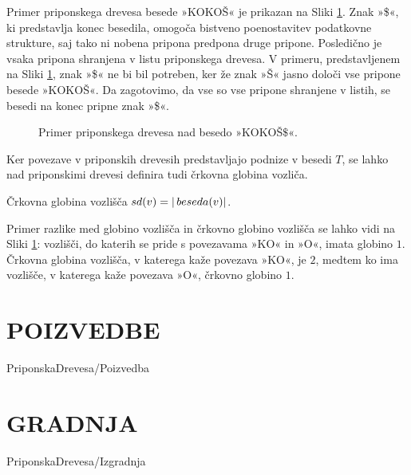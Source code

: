 
Primer priponskega drevesa besede »KOKOŠ« je prikazan na Sliki \ref{fig:PriponskoDrevo}. Znak »\$«, ki predstavlja konec besedila, omogoča bistveno poenostavitev podatkovne strukture, saj tako ni nobena pripona predpona druge pripone. Posledično je vsaka pripona shranjena v listu priponskega drevesa. V primeru, predstavljenem na Sliki \ref{fig:PriponskoDrevo}, znak »\$« ne bi bil potreben, ker že znak »Š« jasno določi vse pripone besede »KOKOŠ«. Da zagotovimo, da vse so vse pripone shranjene v listih, se besedi na konec pripne znak »\$«.

\begin{figure}[htb]
    \begin{center}
        
        \caption{Primer priponskega drevesa nad besedo »KOKOŠ$\$$«.} 
        \label{fig:PriponskoDrevo}
    \end{center}
\end{figure}


%
%
Ker povezave v priponskih drevesih predstavljajo podnize v besedi $T$, se lahko nad priponskimi drevesi definira tudi črkovna globina vozliča.



\begin{defi}
    Črkovna globina vozlišča $ \mathop{sd}(v) =| \mathop{beseda}(v)|$.
\end{defi}

Primer razlike med globino vozlišča in črkovno globino vozlišča se lahko vidi na Sliki \ref{fig:PriponskoDrevo}: vozlišči, do katerih se pride s povezavama »KO« in »O«, imata globino $1$. Črkovna globina vozlišča, v katerega kaže povezava »KO«, je $2$, medtem ko ima vozlišče, v katerega kaže povezava »O«, črkovno globino $1$. 

\section{POIZVEDBE}\label{sec:poizvedba}
{PriponskaDrevesa/Poizvedba}

\section{GRADNJA}\label{sec:izgradnja}
{PriponskaDrevesa/Izgradnja}

